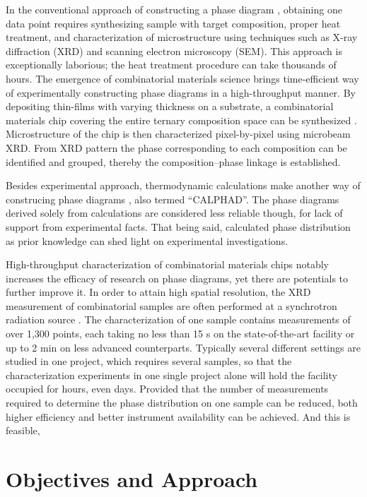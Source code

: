 In the conventional approach of constructing a phase diagram \parencite{CAWgamma}, obtaining one data point requires synthesizing sample with target composition, proper heat treatment, and characterization of microstructure using techniques such as X-ray diffraction (XRD) and scanning electron microscopy (SEM). This approach is exceptionally laborious; the heat treatment procedure can take thousands of hours. The emergence of combinatorial materials science brings time-efficient way of experimentally constructing phase diagrams in a high-throughput manner. By depositing thin-films with varying thickness on a substrate, a combinatorial materials chip covering the entire ternary composition space can be synthesized \parencite{FeCoNiACS}. Microstructure of the chip is then characterized pixel-by-pixel using microbeam XRD. From XRD pattern the phase corresponding to each composition can be identified and grouped, thereby the composition--phase linkage is established.

Besides experimental approach, thermodynamic calculations make another way of construcing phase diagrams \parencite{CAWcalphad}, also termed ``CALPHAD''. The phase diagrams derived solely from calculations are considered less reliable though, for lack of support from experimental facts. That being said, calculated phase distribution as prior knowledge can shed light on experimental investigations.

High-throughput characterization of combinatorial materials chips notably increases the efficacy of research on phase diagrams, yet there are potentials to further improve it. In order to attain high spatial resolution, the XRD measurement of combinatorial samples are often performed at a synchrotron radiation source \parencite{TiNiCu}. The characterization of one sample contains measurements of over 1,300 points, each taking no less than 15 \si{s} on the state-of-the-art facility or up to 2 \si{min} on less advanced counterparts. Typically several different settings are studied in one project, which requires several samples, so that the characterization experiments in one single project alone will hold the facility occupied for hours, even days. Provided that the number of measurements required to determine the phase distribution on one sample can be reduced, both higher efficiency and better instrument availability can be achieved. And this is feasible, 

\section{Objectives and Approach}  %

